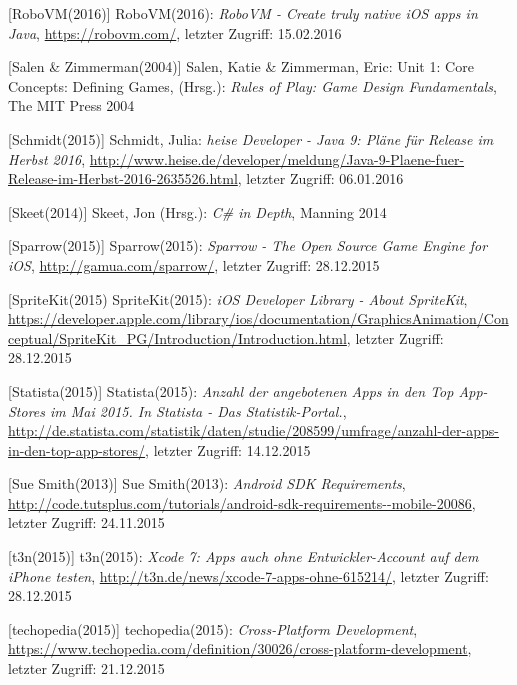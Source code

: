 \begin{thebibliography}{}
[RoboVM(2016)] RoboVM(2016): \emph{RoboVM - Create truly native iOS apps in Java},
\url{https://robovm.com/}, letzter Zugriff: 15.02.2016

[Salen \& Zimmerman(2004)] Salen, Katie \& Zimmerman, Eric: 
\glqq Unit 1: Core Concepts: Defining Games\grqq, 
(Hrsg.): \emph{Rules of Play: Game Design Fundamentals}, The MIT Press 2004

[Schmidt(2015)] Schmidt, Julia: \emph{heise Developer - Java 9: Pläne für Release im Herbst 2016},
\url{http://www.heise.de/developer/meldung/Java-9-Plaene-fuer-Release-im-Herbst-2016-2635526.html}, letzter Zugriff: 06.01.2016

[Skeet(2014)] Skeet, Jon (Hrsg.): 
\emph{C\# in Depth}, Manning 2014

[Sparrow(2015)] Sparrow(2015): \emph{Sparrow - The Open Source Game Engine for iOS},
\url{http://gamua.com/sparrow/}, letzter Zugriff: 28.12.2015

[SpriteKit(2015) SpriteKit(2015): \emph{iOS Developer Library - About SpriteKit},
\url{https://developer.apple.com/library/ios/documentation/GraphicsAnimation/Conceptual/SpriteKit_PG/Introduction/Introduction.html}, letzter Zugriff: 28.12.2015

[Statista(2015)] Statista(2015): \emph{Anzahl der angebotenen Apps in den Top App-Stores im Mai 2015. In Statista - Das Statistik-Portal.},
\url{http://de.statista.com/statistik/daten/studie/208599/umfrage/anzahl-der-apps-in-den-top-app-stores/}, letzter Zugriff: 14.12.2015

[Sue Smith(2013)] Sue Smith(2013): \emph{Android SDK Requirements},
\url{http://code.tutsplus.com/tutorials/android-sdk-requirements--mobile-20086}, letzter Zugriff: 24.11.2015

[t3n(2015)] t3n(2015): \emph{Xcode 7: Apps auch ohne Entwickler-Account auf dem iPhone testen},
\url{http://t3n.de/news/xcode-7-apps-ohne-615214/}, letzter Zugriff: 28.12.2015

[techopedia(2015)] techopedia(2015): \emph{Cross-Platform Development},
\url{https://www.techopedia.com/definition/30026/cross-platform-development}, letzter Zugriff: 21.12.2015


\end{thebibliography}
